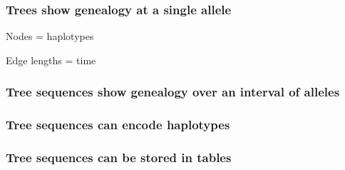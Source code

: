 \documentclass[11pt, mathserif, aspectratio=169]{beamer}
\newcommand{\magenta}[1]{\textcolor{magenta}{#1}}
\newenvironment{wideitemize}{\itemize\addtolength{\itemsep}{10pt}}{\enditemize}
\begin{document}
\begin{frame}
\frametitle{Trees show genealogy at a single allele}
\begin{minipage}{.48\textwidth}
\begin{center}

\end{center}
\end{minipage}\hfill
\begin{minipage}{.48\textwidth}
\begin{wideitemize}
\item Nodes = haplotypes
\item Edge lengths = time
\end{wideitemize}
\end{minipage}
\end{frame}

\begin{frame}
\frametitle{Tree sequences show genealogy over an interval of alleles}
\begin{center}

\end{center}
\end{frame}

\begin{frame}
\frametitle{Tree sequences can encode haplotypes}
\begin{center}

\end{center}
\end{frame}

\begin{frame}
\frametitle{Tree sequences can be stored in tables}
\hspace{-1.5cm}
\begin{minipage}{.48\textwidth}
\begin{center}

\end{center}
\end{minipage}\hfill
\begin{minipage}{.48\textwidth}
\begin{center}

\end{center}
\end{minipage}
\end{frame}
\end{document}
